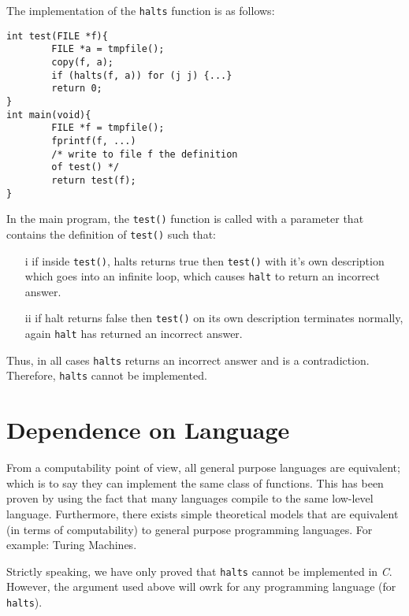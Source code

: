 \documentclass[12pt]{book}
\begin{document}
The implementation of the \texttt{halts} function is as follows:
\begin{verbatim}
int test(FILE *f){
        FILE *a = tmpfile();
        copy(f, a);
        if (halts(f, a)) for (j j) {...}
        return 0;
}
int main(void){
        FILE *f = tmpfile();
        fprintf(f, ...)
        /* write to file f the definition
        of test() */
        return test(f);
}
\end{verbatim}

In the main program, the \texttt{test()} function is called with 
a parameter that contains the definition of \texttt{test()} such that:
\begin{enumerate}
        \item[i] if inside \texttt{test()}, halts returns true then
                \texttt{test()} with it's own description which goes into
                an infinite loop, which causes \texttt{halt} to
                return an incorrect answer.
        \item[ii] if halt returns false then \texttt{test()} on its 
                own description terminates normally, again \texttt{halt}
                has returned an incorrect answer.
\end{enumerate}

Thus, in all cases \texttt{halts} returns an incorrect answer and is a 
contradiction. Therefore, \texttt{halts} cannot be implemented.

\section*{Dependence on Language}
From a computability point of view, all general purpose languages
are equivalent; which is to say they can implement the same
class of functions. This has been proven by using the fact that
many languages compile to the same low-level language. Furthermore,
there exists simple theoretical models that are equivalent (in terms
of computability) to general purpose programming languages. For example: 
Turing Machines.

Strictly speaking, we have only proved that \texttt{halts} cannot be implemented
in \textit{C}. However, the argument used above will owrk for any programming 
language (for \texttt{halts}).
\end{document}
